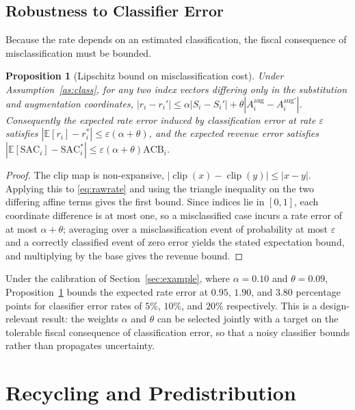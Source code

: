 \documentclass[journal]{IEEEtran}
\theoremstyle{plain}
\newtheorem{proposition}{Proposition}
\theoremstyle{definition}
\newcommand{\ACB}{\mathrm{ACB}}
\newcommand{\SAC}{\mathrm{SAC}}
\newcommand{\clip}{\operatorname{clip}}
\begin{document}
\subsection{Robustness to Classifier Error}

Because the rate depends on an estimated classification, the fiscal consequence of misclassification must be bounded.

\begin{proposition}[Lipschitz bound on misclassification cost]
\label{prop:robust}
Under Assumption~\ref{as:class}, for any two index vectors differing only in the substitution and augmentation coordinates, $|r_i - r_i'| \le \alpha|S_i - S_i'| + \theta|A^{\mathrm{aug}}_i - A^{\mathrm{aug}\prime}_i|$. Consequently the expected rate error induced by classification error at rate $\varepsilon$ satisfies $|\mathbb{E}[r_i] - r_i^{*}| \le \varepsilon(\alpha + \theta)$, and the expected revenue error satisfies $|\mathbb{E}[\SAC_i] - \SAC_i^{*}| \le \varepsilon(\alpha+\theta)\ACB_i$.
\end{proposition}

\begin{proof}
The clip map is non-expansive, $|\clip(x)-\clip(y)|\le|x-y|$. Applying this to \eqref{eq:rawrate} and using the triangle inequality on the two differing affine terms gives the first bound. Since indices lie in $[0,1]$, each coordinate difference is at most one, so a misclassified case incurs a rate error of at most $\alpha+\theta$; averaging over a misclassification event of probability at most $\varepsilon$ and a correctly classified event of zero error yields the stated expectation bound, and multiplying by the base gives the revenue bound.
\end{proof}

Under the calibration of Section~\ref{sec:example}, where $\alpha=0.10$ and $\theta=0.09$, Proposition~\ref{prop:robust} bounds the expected rate error at $0.95$, $1.90$, and $3.80$ percentage points for classifier error rates of $5\%$, $10\%$, and $20\%$ respectively. This is a design-relevant result: the weights $\alpha$ and $\theta$ can be selected jointly with a target on the tolerable fiscal consequence of classification error, so that a noisy classifier bounds rather than propagates uncertainty.

\section{Recycling and Predistribution}
\label{sec:recycle}
\end{document}

